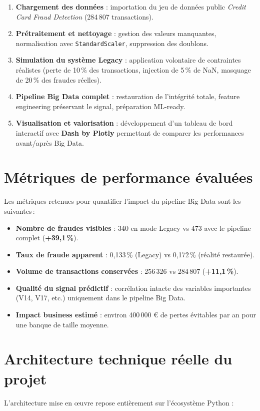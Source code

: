 \begin{enumerate}
    \item \textbf{Chargement des données} : importation du jeu de données public \textit{Credit Card Fraud Detection} (284\,807 transactions).
    \item \textbf{Prétraitement et nettoyage} : gestion des valeurs manquantes, normalisation avec \texttt{StandardScaler}, suppression des doublons.
    \item \textbf{Simulation du système Legacy} : application volontaire de contraintes réalistes (perte de 10\,\% des transactions, injection de 5\,\% de NaN, masquage de 20\,\% des fraudes réelles).
    \item \textbf{Pipeline Big Data complet} : restauration de l’intégrité totale, feature engineering préservant le signal, préparation ML-ready.
    \item \textbf{Visualisation et valorisation} : développement d’un tableau de bord interactif avec \textbf{Dash by Plotly} permettant de comparer les performances avant/après Big Data.
\end{enumerate}

\section{Métriques de performance évaluées}
Les métriques retenues pour quantifier l’impact du pipeline Big Data sont les suivantes\,:

\begin{itemize}
    \item \textbf{Nombre de fraudes visibles} : 340 en mode Legacy vs 473 avec le pipeline complet (\textbf{+39,1\,\%}).
    \item \textbf{Taux de fraude apparent} : 0,133\,\% (Legacy) vs 0,172\,\% (réalité restaurée).
    \item \textbf{Volume de transactions conservées} : 256\,326 vs 284\,807 (\textbf{+11,1\,\%}).
    \item \textbf{Qualité du signal prédictif} : corrélation intacte des variables importantes (V14, V17, etc.) uniquement dans le pipeline Big Data.
    \item \textbf{Impact business estimé} : environ 400\,000 € de pertes évitables par an pour une banque de taille moyenne.
\end{itemize}

\section{Architecture technique réelle du projet}
L’architecture mise en œuvre repose entièrement sur l’écosystème Python :

